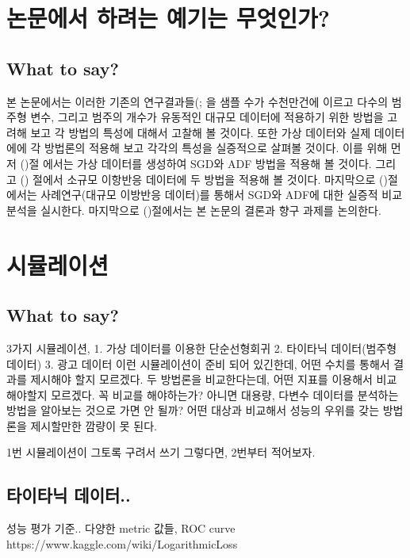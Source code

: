 \documentclass[oneside,b5paper,11pt]{article} %
\begin{document}
\section{논문에서 하려는 예기는 무엇인가?}
\subsection{What to say?}
 본 논문에서는 이러한 기존의 연구결과들(\citet{Bottou2010}; \citet{Opper1996}을 샘플 수가 수천만건에 이르고 다수의 범주형 변수, 그리고 범주의 개수가 유동적인 대규모 데이터에 적용하기 위한 방법을 고려해 보고 각 방법의 특성에 대해서 고찰해 볼 것이다. 또한 가상 데이터와 실제 데이터에에 각 방법론의 적용해 보고 각각의 특성을 실증적으로 살펴볼 것이다. 이를 위해 먼저 ()절 에서는 가상 데이터를 생성하여 SGD와 ADF 방법을 적용해 볼 것이다. 그리고 () 절에서 소규모 이항반응 데이터에 두 방법을 적용해 볼 것이다. 마지막으로 ()절에서는 사례연구(대규모 이방반응 데이터)를 통해서 SGD와 ADF에 대한 실증적 비교 분석을 실시한다. 마지막으로 ()절에서는 본 논문의 결론과 향구 과제를 논의한다.


\section{시뮬레이션}
\subsection{What to say?}
3가지 시뮬레이션, 
1. 가상 데이터를 이용한 단순선형회귀
2. 타이타닉 데이터(범주형 데이터)
3. 광고 데이터
이런 시뮬레이션이 준비 되어 있긴한데, 어떤 수치를 통해서 결과를 제시해야 할지 모르겠다. 두 방법론을 비교한다는데, 어떤 지표를 이용해서 비교해야할지 모르겠다. 꼭 비교를 해야하는가? 아니면 대용량, 다변수 데이터를 분석하는 방법을 알아보는 것으로 가면 안 될까? 어떤 대상과 비교해서 성능의 우위를 갖는 방법론을 제시할만한 깜량이 못 된다.

 1번 시뮬레이션이 그토록 구려서 쓰기 그렇다면, 2번부터 적어보자. 


\subsection{타이타닉 데이터..}
성능 평가 기준.. 다양한 metric 값들, ROC curve
https://www.kaggle.com/wiki/LogarithmicLoss
\end{document}
